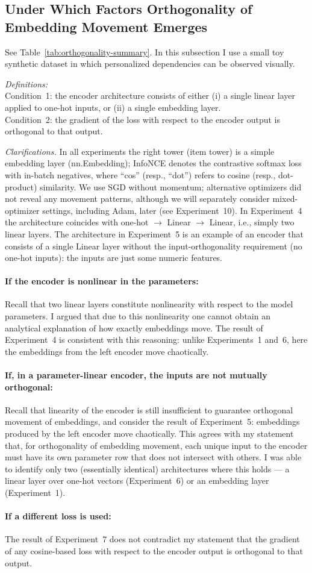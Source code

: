 \subsection{Under Which Factors Orthogonality of Embedding Movement Emerges}

See Table~\ref{tab:orthogonality-summary}. In this subsection I use a small toy synthetic dataset in which personalized dependencies can be observed visually.

\textit{Definitions:}\\
Condition~1: the encoder architecture consists of either (i) a single linear layer applied to one-hot inputs, or (ii) a single embedding layer.\\ 
Condition~2: the gradient of the loss with respect to the encoder output is orthogonal to that output.

\textit{Clarifications.} In all experiments the right tower (item tower) is a simple embedding layer (nn.Embedding); InfoNCE \cite{oord2018cpc} denotes the contrastive softmax loss with in-batch negatives, where ``cos'' (resp., ``dot'') refers to cosine (resp., dot-product) similarity. We use SGD without momentum; alternative optimizers did not reveal any movement patterns, although we will separately consider mixed-optimizer settings, including Adam, later (see Experiment~10). In Experiment~4 the architecture coincides with one-hot $\to$ Linear $\to$ Linear, i.e., simply two linear layers. The architecture in Experiment~5 is an example of an encoder that consists of a single Linear layer without the input-orthogonality requirement (no one-hot inputs): the inputs are just some numeric features.

\paragraph{If the encoder is nonlinear in the parameters:}
Recall that two linear layers constitute nonlinearity with respect to the model parameters. I argued that due to this nonlinearity one cannot obtain an analytical explanation of how exactly embeddings move. The result of Experiment~4 is consistent with this reasoning: unlike Experiments~1 and~6, here the embeddings from the left encoder move chaotically.

\paragraph{If, in a parameter-linear encoder, the inputs are not mutually orthogonal:}
Recall that linearity of the encoder is still insufficient to guarantee orthogonal movement of embeddings, and consider the result of Experiment~5: embeddings produced by the left encoder move chaotically. This agrees with my statement that, for orthogonality of embedding movement, each unique input to the encoder must have its own parameter row that does not intersect with others. I was able to identify only two (essentially identical) architectures where this holds — a linear layer over one-hot vectors (Experiment~6) or an embedding layer (Experiment~1).

\paragraph{If a different loss is used:}
The result of Experiment~7 does not contradict my statement that the gradient of any cosine-based loss with respect to the encoder output is orthogonal to that output.
